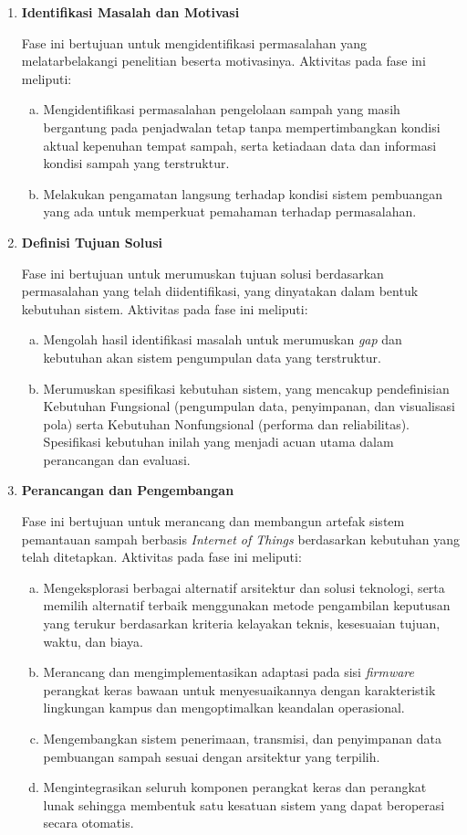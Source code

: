\begin{enumerate}
    \item \textbf{Identifikasi Masalah dan Motivasi}

    Fase ini bertujuan untuk mengidentifikasi permasalahan yang melatarbelakangi penelitian beserta motivasinya. Aktivitas pada fase ini meliputi:
    \begin{enumerate}[a.]
        \item Mengidentifikasi permasalahan pengelolaan sampah yang masih bergantung pada penjadwalan tetap tanpa mempertimbangkan kondisi aktual kepenuhan tempat sampah, serta ketiadaan data dan informasi kondisi sampah yang terstruktur.
        \item Melakukan pengamatan langsung terhadap kondisi sistem pembuangan yang ada untuk memperkuat pemahaman terhadap permasalahan.
    \end{enumerate}

    \item \textbf{Definisi Tujuan Solusi}

    Fase ini bertujuan untuk merumuskan tujuan solusi berdasarkan permasalahan yang telah diidentifikasi, yang dinyatakan dalam bentuk kebutuhan sistem. Aktivitas pada fase ini meliputi:
    \begin{enumerate}[a.]
        \item Mengolah hasil identifikasi masalah untuk merumuskan \textit{gap} dan kebutuhan akan sistem pengumpulan data yang terstruktur.
        \item Merumuskan spesifikasi kebutuhan sistem, yang mencakup pendefinisian Kebutuhan Fungsional (pengumpulan data, penyimpanan, dan visualisasi pola) serta Kebutuhan Nonfungsional (performa dan reliabilitas). Spesifikasi kebutuhan inilah yang menjadi acuan utama dalam perancangan dan evaluasi.
    \end{enumerate}

    \item \textbf{Perancangan dan Pengembangan}

    Fase ini bertujuan untuk merancang dan membangun artefak sistem pemantauan sampah berbasis \textit{Internet of Things} berdasarkan kebutuhan yang telah ditetapkan. Aktivitas pada fase ini meliputi:
    \begin{enumerate}[a.]
        \item Mengeksplorasi berbagai alternatif arsitektur dan solusi teknologi, serta memilih alternatif terbaik menggunakan metode pengambilan keputusan yang terukur berdasarkan kriteria kelayakan teknis, kesesuaian tujuan, waktu, dan biaya.
        \item Merancang dan mengimplementasikan adaptasi pada sisi \textit{firmware} perangkat keras bawaan untuk menyesuaikannya dengan karakteristik lingkungan kampus dan mengoptimalkan keandalan operasional.
        \item Mengembangkan sistem penerimaan, transmisi, dan penyimpanan data pembuangan sampah sesuai dengan arsitektur yang terpilih.
        \item Mengintegrasikan seluruh komponen perangkat keras dan perangkat lunak sehingga membentuk satu kesatuan sistem yang dapat beroperasi secara otomatis.
    \end{enumerate}


\end{enumerate}
